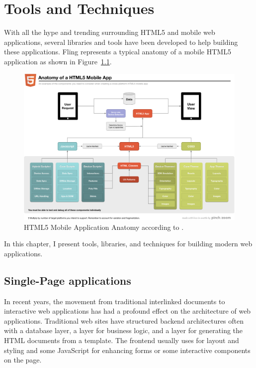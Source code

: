 \chapter{Tools and Techniques}
\label{chapter:tools-and-techniques}

With all the hype and trending surrounding HTML5 and mobile web
applications, several libraries and tools have been developed to help
building these applications. Fling \cite{fling2011anatomy} represents
a typical anatomy of a mobile HTML5 application as shown in
Figure~\ref{figure:anatomy-of-a-html5-mobile-app.png}.

\begin{figure}[h!]
  \includegraphics[width=\textwidth]{images/anatomy-of-a-html5-mobile-app.png}
  \caption{HTML5 Mobile Application Anatomy according to
    \cite{fling2011anatomy}.}
  \label{figure:anatomy-of-a-html5-mobile-app.png}
\end{figure}

In this chapter, I present tools, libraries, and techniques for
building modern web applications.

\section{Single-Page applications}
\label{section:single-page-applications}

In recent years, the movement from traditional interlinked documents
to interactive web applications has had a profound effect on the
architecture of web applications. Traditional web sites have
structured backend architectures often with a database layer, a layer
for business logic, and a layer for generating the HTML documents from
a template. The frontend usually uses  for layout and
styling and some JavaScript for enhancing forms or some interactive
components on the page.


